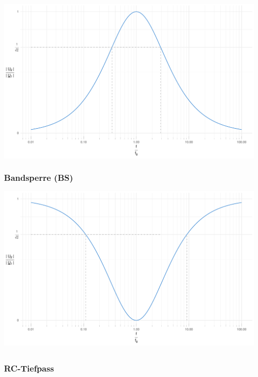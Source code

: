 \documentclass[a4paper, 12pt]{article}
\begin{document}
\begin{center}
    \includegraphics[scale=0.5]{./R/Band/BP/BP_clean.pdf}

  \vspace{0.021276873\paperheight}

  \subsubsection*{Bandsperre (BS)}

    \includegraphics[scale=0.5]{./R/Band/BS/BS_clean.pdf}

  \end{center}

\subsection{}
\subsubsection*{RC-Tiefpass}
\end{document}
